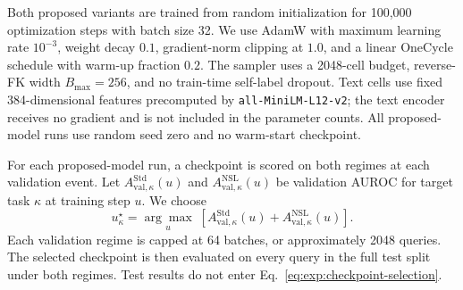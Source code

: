 Both proposed variants are trained from random initialization for 100,000
optimization steps with batch size 32. We use AdamW with maximum learning
rate \(10^{-3}\), weight decay \(0.1\), gradient-norm clipping at \(1.0\),
and a linear OneCycle schedule with warm-up fraction \(0.2\). The sampler
uses a 2048-cell budget, reverse-FK width \(B_{\max}=256\), and no
train-time self-label dropout. Text cells use fixed 384-dimensional features
precomputed by \texttt{all-MiniLM-L12-v2}; the text encoder receives no
gradient and is not included in the parameter counts. All proposed-model
runs use random seed zero and no warm-start checkpoint.

For each proposed-model run, a checkpoint is scored on both regimes at each
validation event. Let
\(A_{\mathrm{val},\kappa}^{\mathrm{Std}}(u)\) and
\(A_{\mathrm{val},\kappa}^{\mathrm{NSL}}(u)\) be validation AUROC for
target task \(\kappa\) at training step \(u\). We choose
\begin{equation}
  u_\kappa^\star
  =
  \underset{u}{\arg\max}\;
  \left[
    A_{\mathrm{val},\kappa}^{\mathrm{Std}}(u)
    +
    A_{\mathrm{val},\kappa}^{\mathrm{NSL}}(u)
  \right].
\label{eq:exp:checkpoint-selection}
\end{equation}
Each validation regime is capped at 64 batches, or approximately 2048
queries. The selected checkpoint is then evaluated on every query in the
full test split under both regimes. Test results do not enter
Eq.~\eqref{eq:exp:checkpoint-selection}.

